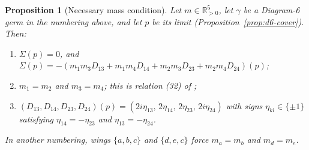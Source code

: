 \documentclass[11pt]{amsart}
\newenvironment{romanlist}{\begin{enumerate}\renewcommand{\labelenumi}{(\roman{enumi})}%
  \renewcommand{\theenumi}{\roman{enumi}}}{\end{enumerate}}
\newtheorem{proposition}[theorem]{Proposition}
\theoremstyle{definition}
\theoremstyle{remark}
\newcommand{\Rp}{\mathbb{R}_{>0}}
\begin{document}
\begin{proposition}[Necessary mass condition]\label{prop:d6-first}
Let $m\in\Rp^5$, let $\gamma$ be a Diagram-6 germ in the numbering above, and let $p$ be its
limit (Proposition~\ref{prop:d6-cover}).  Then:
\begin{romanlist}
  \item $\Sigma(p)=0$, and $\Sigma(p)=-(m_1m_3D_{13}+m_1m_4D_{14}+m_2m_3D_{23}+m_2m_4D_{24})(p)$;
  \item $m_1=m_2$ and $m_3=m_4$; this is relation (32) of \cite[\S8.6]{AK};
  \item $(D_{13},D_{14},D_{23},D_{24})(p)=(2i\eta_{13},\,2\eta_{14},\,2\eta_{23},\,2i\eta_{24})$
  with signs $\eta_{kl}\in\{\pm1\}$ satisfying $\eta_{14}=-\eta_{23}$ and $\eta_{13}=-\eta_{24}$.
\end{romanlist}
In another numbering, wings $\{a,b,c\}$ and $\{d,e,c\}$ force $m_a=m_b$ and $m_d=m_e$.
\end{proposition}
\end{document}
